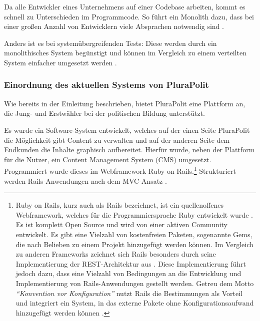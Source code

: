 Da alle Entwickler eines Unternehmens auf einer Codebase arbeiten, kommt es schnell zu Unterschieden im Programmcode. So führt ein Monolith dazu, dass bei einer großen Anzahl von Entwicklern viele Absprachen notwendig sind \parencite[vgl.][Kap. 2.2.4]{newman_monolith_2019}.

Anders ist es bei systemübergreifenden Tests: Diese werden durch ein monolithisches System begünstigt und können im Vergleich zu einem verteilten System einfacher umgesetzt werden  \parencite[vgl.][Kap. 2.2.5]{newman_monolith_2019}.

\subsubsection{Einordnung des aktuellen Systems von PluraPolit}
\label{sec:einordnung}

Wie bereits in der Einleitung beschrieben, bietet PluraPolit eine Plattform an, die Jung- und Erstwähler bei der politischen Bildung unterstützt.

Es wurde ein Software-System entwickelt, welches auf der einen Seite PluraPolit die Möglichkeit gibt Content zu verwalten und auf der anderen Seite dem Endkunden die Inhalte graphisch aufbereitet. Hierfür wurde, neben der Plattform für die Nutzer, ein Content Management System (CMS) umgesetzt. Programmiert wurde dieses im  Webframework Ruby on Rails.\footnote{
Ruby on Rails, kurz auch als Rails bezeichnet, ist ein quellenoffenes Webframework, welches für die Programmiersprache Ruby entwickelt wurde \parencites[vgl.][S.4]{hartl_ruby_2016}{ruby_org}[vgl.][S. 24]{sieben_wochen}. Es ist komplett Open Source und wird von einer aktiven Community entwickelt. Es gibt eine Vielzahl von kostenfreien Paketen, sogenannte Gems, die nach Belieben zu einem Projekt hinzugefügt werden können. Im Vergleich zu anderen Frameworks zeichnet sich Rails besonders durch seine Implementierung der REST-Architektur aus \parencite[vgl.][S. 5]{hartl_ruby_2016}. Diese Implementierung führt jedoch dazu, dass eine Vielzahl von Bedingungen an die Entwicklung und Implementierung von Rails-Anwendungen gestellt werden. Getreu dem Motto \textit{\enquote{Konvention vor Konfiguration}} nutzt Rails die Bestimmungen als Vorteil und integriert ein System, in das externe Pakete ohne Konfigurationsaufwand hinzugefügt werden können \parencite{ruby_doctrine}.
} Strukturiert werden Rails-Anwendungen nach dem MVC-Ansatz \parencites[vgl.][S. 66 ff.]{hartl_ruby_2016}.

